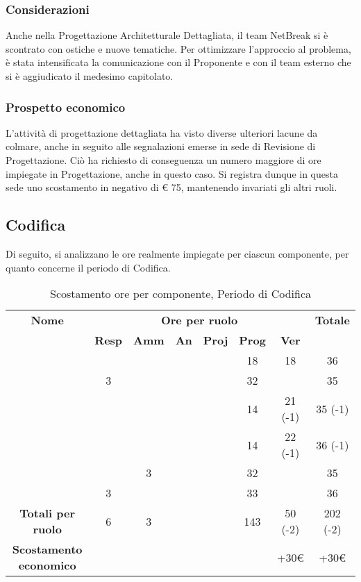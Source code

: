 \subsubsection{Considerazioni}
Anche nella Progettazione Architetturale Dettagliata, il team NetBreak si è scontrato con ostiche e nuove tematiche. Per ottimizzare l'approccio al problema, è stata intensificata la comunicazione con il Proponente e con il team esterno che si è aggiudicato il medesimo capitolato.

\subsubsection{Prospetto economico}
L'attività di progettazione dettagliata ha visto diverse ulteriori lacune da colmare, anche in seguito alle segnalazioni emerse in sede di Revisione di Progettazione. Ciò ha richiesto di conseguenza un numero maggiore di ore impiegate in Progettazione, anche in questo caso. Si registra dunque in questa sede uno scostamento in negativo di € 75, mantenendo invariati gli altri ruoli.

\newpage
\subsection{Codifica}

Di seguito, si analizzano le ore realmente impiegate per ciascun componente, per quanto concerne il periodo di Codifica.

\begin{table}[H]
	\begin{center}
		\begin{tabular}{|c|c|c|c|c|c|c|c|}
			\hline
			\textbf{Nome} & \multicolumn{6}{c|}{\textbf{Ore per ruolo}} & \textbf{Totale} \\\cline{2-7}
			& \textbf{Resp} & \textbf{Amm} & \textbf{An} & \textbf{Proj} & \textbf{Prog} & \textbf{Ver} & \\
			\hline
			\MC			&		&		&		&		&	18	&	18	&	36	\\
			\hline
			\AN			&	3	&		&		&	 	&	32	&		& 	35	\\
			\hline
			\DAN		&		&		&		&		&	14	&	21 (-1)	&	35 (-1)	\\
			\hline
			\AS			&		&	 	&	 	&		&	14 	& 	22 (-1)	&	36	(-1)\\
			\hline
			\NS 		&		&	3	&		&		&	32	& 		&	35	\\
			\hline
			\DS			& 	3	&		&		&		&	33	&		&	36	\\
			\hline
			\textbf{Totali per ruolo}	& 	6 	&	3 	&		&		&	143	&	50 (-2) 	&	202 (-2)	\\
			\hline
			\textbf{Scostamento economico}	& 		&		&		&		&		&	+30€	&	+30€	\\
			\hline
		\end{tabular}
	\end{center}
	\caption{Scostamento ore per componente, Periodo di Codifica}
\end{table}


